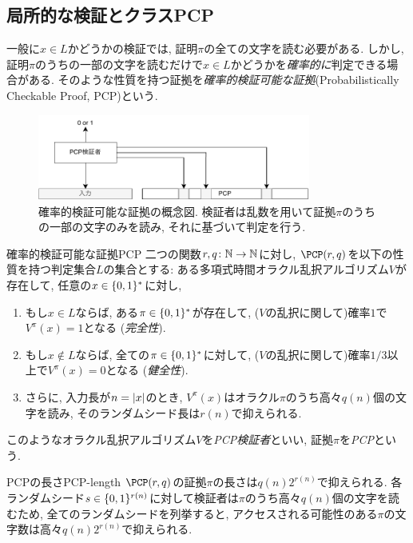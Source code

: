 \subsection{局所的な検証とクラスPCP} \label{sec:PCP}

一般に$x\in L$かどうかの検証では, 証明$\pi$の全ての文字を読む必要がある.
しかし, 証明$\pi$のうちの一部の文字を読むだけで$x\in L$かどうかを\emph{確率的に}判定できる場合がある.
そのような性質を持つ証拠を\emph{確率的検証可能な証拠}(Probabilistically Checkable Proof, PCP)という.

\begin{figure}[htbp]
  \centering
  \includegraphics[width=0.8\textwidth]{images/PCPverifier.drawio.pdf}
  \caption{確率的検証可能な証拠の概念図. 検証者は乱数を用いて証拠$\pi$のうちの一部の文字のみを読み, それに基づいて判定を行う.}
  \label{fig:pcpverifier}
\end{figure}


\begin{definition}{確率的検証可能な証拠}{PCP}
  二つの関数$r,q\colon\mathbb{N}\to\mathbb{N}$に対し, $\PCP(r,q)$を以下の性質を持つ判定集合$L$の集合とする: ある多項式時間オラクル乱択アルゴリズム$V$が存在して, 任意の$x\in\{0,1\}^*$に対し,
  \begin{enumerate}
  \item もし$x\in L$ならば, ある$\pi\in\{0,1\}^*$が存在して, ($V$の乱択に関して)確率$1$で$V^\pi(x)=1$となる (\emph{完全性}).
  \item もし$x\notin L$ならば, 全ての$\pi\in\{0,1\}^*$に対して, ($V$の乱択に関して)確率$1/3$以上で$V^\pi(x)=0$となる (\emph{健全性}).
  \item さらに, 入力長が$n=\abs{x}$のとき, $V^\pi(x)$はオラクル$\pi$のうち高々$q(n)$個の文字を読み, そのランダムシード長は$r(n)$で抑えられる.
  \end{enumerate}
  このようなオラクル乱択アルゴリズム$V$を\emph{PCP検証者}といい, 証拠$\pi$を\emph{PCP}という.
\end{definition}
\begin{remark}{PCPの長さ}{PCP-length}
  $\PCP(r,q)$の証拠$\pi$の長さは$q(n)2^{r(n)}$で抑えられる.
  各ランダムシード$s \in \{0,1\}^{r(n)}$に対して検証者は$\pi$のうち高々$q(n)$個の文字を読むため, 全てのランダムシードを列挙すると, アクセスされる可能性のある$\pi$の文字数は高々$q(n)2^{r(n)}$で抑えられる.
\end{remark}

